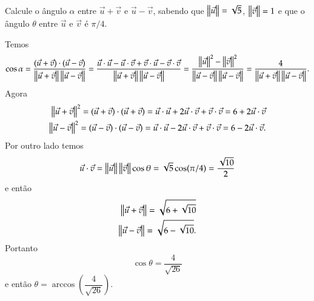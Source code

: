 \begin{exemplos}
  Calcule o \^angulo $\alpha$ entre $\vec{u} + \vec{v}$ e $\vec{u} - \vec{v}$, sabendo que $\left\Vert{\vec{u}}\right\Vert = \sqrt{5}$, $\left\Vert{\vec{v}}\right\Vert = 1$ e que o \^angulo $\theta$ entre $\vec{u}$ e $\vec{v}$ \'e $\pi/4$.
  \begin{solucao}
    Temos
    \begin{align*}
      \cos\alpha = \dfrac{(\vec{u} + \vec{v})\cdot(\vec{u} - \vec{v})}{\left\Vert{\vec{u} + \vec{v}}\right\Vert\left\Vert{\vec{u} - \vec{v}}\right\Vert} = \dfrac{\vec{u}\cdot\vec{u} - \vec{u}\cdot\vec{v} + \vec{v}\cdot\vec{u} - \vec{v}\cdot\vec{v}}{\left\Vert{\vec{u} + \vec{v}}\right\Vert\left\Vert{\vec{u} - \vec{v}}\right\Vert} = \dfrac{\left\Vert{\vec{u}}\right\Vert^2 - \left\Vert{\vec{v}}\right\Vert^2}{\left\Vert{\vec{u} - \vec{v}}\right\Vert\left\Vert{\vec{u} - \vec{v}}\right\Vert} = \dfrac{4}{\left\Vert{\vec{u} + \vec{v}}\right\Vert\left\Vert{\vec{u} - \vec{v}}\right\Vert}.
    \end{align*}
    Agora
    \begin{align*}
      \left\Vert{\vec{u} + \vec{v}}\right\Vert^2 = (\vec{u} + \vec{v})\cdot(\vec{u} + \vec{v}) = \vec{u}\cdot\vec{u} + 2\vec{u}\cdot\vec{v} + \vec{v}\cdot\vec{v} = 6 + 2\vec{u}\cdot\vec{v}\\
      \left\Vert{\vec{u} - \vec{v}}\right\Vert^2 = (\vec{u} - \vec{v})\cdot(\vec{u} - \vec{v}) = \vec{u}\cdot\vec{u} - 2\vec{u}\cdot\vec{v} + \vec{v}\cdot\vec{v} = 6 - 2\vec{u}\cdot\vec{v}.
    \end{align*}
    Por outro lado temos
    \begin{align*}
      \vec{u}\cdot\vec{v} = \left\Vert{\vec{u}}\right\Vert\left\Vert{\vec{v}}\right\Vert\cos\theta = \sqrt{5}\cos(\pi/4) = \dfrac{\sqrt{10}}{2}
    \end{align*}
    e ent\~ao
    \begin{align*}
      \left\Vert{\vec{u} + \vec{v}}\right\Vert = \sqrt{6 + \sqrt{10}}\\
      \left\Vert{\vec{u} - \vec{v}}\right\Vert = \sqrt{6 - \sqrt{10}}.
    \end{align*}
    Portanto
    \[
      \cos\theta = \dfrac{4}{\sqrt{26}}
    \]
    e ent\~ao $\theta = \arccos\left(\dfrac{4}{\sqrt{26}}\right)$.
  \end{solucao}
\end{exemplos}

